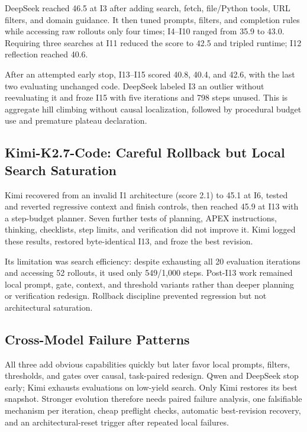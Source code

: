 DeepSeek reached 46.5 at I3 after adding search, fetch, file/Python tools, URL
filters, and domain guidance.  It then tuned prompts, filters, and completion
rules while accessing raw rollouts only four times; I4--I10 ranged from 35.9 to
43.0.  Requiring three searches at I11 reduced the score to 42.5 and tripled
runtime; I12 reflection reached 40.6.

After an attempted early stop, I13--I15 scored 40.8, 40.4, and 42.6, with the
last two evaluating unchanged code.  DeepSeek labeled I3 an outlier without
reevaluating it and froze I15 with five iterations and 798 steps unused.  This
is aggregate hill climbing without causal localization, followed by procedural
budget use and premature plateau declaration.

\subsection{Kimi-K2.7-Code: Careful Rollback but Local Search Saturation}
\label{app:kimi-failure-mode}

Kimi recovered from an invalid I1 architecture (score 2.1) to 45.1 at I6,
tested and reverted regressive context and finish controls, then reached 45.9
at I13 with a step-budget planner.  Seven further tests of planning, APEX
instructions, thinking, checklists, step limits, and verification did not
improve it.  Kimi logged these results, restored byte-identical I13, and froze
the best revision.

Its limitation was search efficiency: despite exhausting all 20 evaluation
iterations and accessing 52 rollouts, it used only 549/1,000 steps.  Post-I13
work remained local prompt, gate, context, and threshold variants rather than
deeper planning or verification redesign.  Rollback discipline prevented
regression but not architectural saturation.

\subsection{Cross-Model Failure Patterns}
\label{app:cross-model-failures}

All three add obvious capabilities quickly but later favor local prompts,
filters, thresholds, and gates over causal, task-paired redesign.  Qwen and
DeepSeek stop early; Kimi exhausts evaluations on low-yield search.  Only Kimi
restores its best snapshot.  Stronger evolution therefore needs paired failure
analysis, one falsifiable mechanism per iteration, cheap preflight checks,
automatic best-revision recovery, and an architectural-reset trigger after
repeated local failures.


